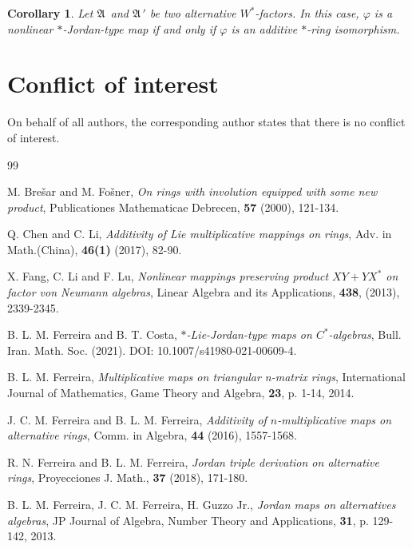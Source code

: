 \documentclass{amsart}
\newtheorem{corollary}{Corollary}[section]
\def\A{{\mathfrak A}\, }
\begin{document}
\begin{corollary}
Let $\A$ and $\A'$ be two alternative $W^{*}$-factors. In this case, $\varphi$ is a nonlinear $*$-Jordan-type map if and only if $\varphi$ is an additive $*$-ring isomorphism.
  
\end{corollary}

\section{Conflict of interest}
On behalf of all authors, the corresponding author states that there is no conflict of interest.

\begin{thebibliography}{99}


M. Bre\v sar and M. Fo\v sner, 
{\em On rings with involution equipped with some new product}, 
Publicationes Mathematicae Debrecen, \textbf{57} (2000), 121-134.

Q. Chen and C. Li,  
{\em Additivity of Lie multiplicative mappings on rings}, 
Adv. in Math.(China),  \textbf{46(1)} (2017), 82-90.

X. Fang, C. Li and F. Lu, 
{\em Nonlinear mappings preserving product $XY + YX^{*}$ on factor von Neumann algebras}, 
Linear Algebra and its Applications, \textbf{438}, (2013), 2339-2345.


B. L. M. Ferreira and B. T. Costa, 
{\em $*$-Lie-Jordan-type maps on $C^{*}$-algebras}, 
Bull. Iran. Math. Soc. (2021).  DOI: 10.1007/s41980-021-00609-4.

B. L. M. Ferreira, 
{\em Multiplicative maps on triangular n-matrix rings}, 
International Journal of Mathematics, Game Theory and Algebra, \textbf{23}, p. 1-14, 2014.

J. C. M. Ferreira and B. L. M. Ferreira, 
{\em Additivity of $n$-multiplicative maps on alternative rings}, 
Comm. in Algebra, \textbf{44} (2016), 1557-1568.

R. N. Ferreira and B. L. M. Ferreira, 
{\em Jordan triple derivation on alternative rings}, 
Proyecciones J. Math., \textbf{37} (2018), 171-180.

B. L. M. Ferreira, J. C. M.  Ferreira, H. Guzzo Jr., 
{\em Jordan maps on alternatives algebras}, 
JP Journal of Algebra, Number Theory and Applications, \textbf{31}, p. 129-142, 2013.


\end{thebibliography}
\end{document}
